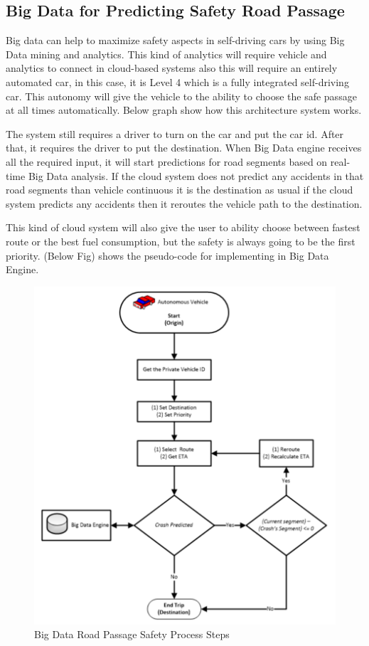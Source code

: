 \documentclass{acm_proc_article-sp}
\begin{document}
\subsection{Big Data for Predicting Safety Road Passage}
Big data can help to maximize safety aspects in self-driving cars by using Big Data mining and analytics. This kind of analytics will require vehicle and analytics to connect in cloud-based systems also this will require an entirely automated car, in this case, it is Level 4 which is a fully integrated self-driving car. This autonomy will give the vehicle to the ability to choose the safe passage at all times automatically. Below graph show how this architecture system works. \cite{hamzah}
\par The system still requires a driver to turn on the car and put the car id. After that, it requires the driver to put the destination. When Big Data engine receives all the required input, it will start predictions for road segments based on real-time Big Data analysis. If the cloud system does not predict any accidents in that road segments than vehicle continuous it is the destination as usual if the cloud system predicts any accidents then it reroutes the vehicle path to the destination.\cite{hamzah}
\par This kind of cloud system will also give the user to ability choose between fastest route or the best fuel consumption, but the safety is always going to be the first priority. (Below Fig) shows the pseudo-code for implementing in Big Data Engine.
\begin{figure}[!ht]
  \centering
      \includegraphics[width=1.0\columnwidth]{images/picture9.png}
  \caption{Big Data Road Passage Safety Process Steps}\label{F:architecture}
\end{figure}
\end{document}

